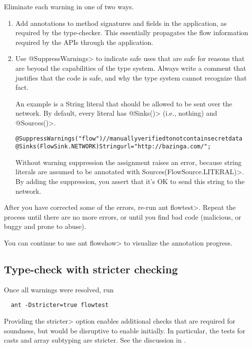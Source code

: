 Eliminate each warning in one of two ways.
\begin{enumerate}
\item Add annotations to method signatures and fields in the application, as
required by the type-checker. This essentially propagates the flow
information required by the APIs through the application.

\item Use \<@SuppressWarnings> to indicate safe uses that are safe for reasons
that are beyond the capabilities of the type system. Always write a
comment that justifies that the code is safe, and why the type system
cannot recognize that fact.

An example is a String literal that should be allowed to be sent
over the network. By default, every literal has \<@Sinks()>
(i.e., nothing) and \<@Sources()>.

\begin{alltt}
    @SuppressWarnings("flow") // manually verified to not contain secret data
    @Sinks(FlowSink.NETWORK) String url = "http://bazinga.com/";
\end{alltt}

Without warning suppression the assignment raises an error, because string literals
are assumed to be annotated with \<Sources(FlowSource.LITERAL)>. By adding the suppression, you
assert that it's OK to send this string to the network. 

\end{enumerate}

After you have corrected some of the errors, re-run \<ant flowtest>.
Repeat the process until there are no more errors, or until you find bad
code (malicious, or buggy and prone to abuse).

You can continue to use \<ant flowshow> to visualize the annotation
progress.  


\subsection{Type-check with stricter checking}

Once all warnings were resolved, run 

\begin{Verbatim}
  ant -Dstricter=true flowtest
\end{Verbatim}

\noindent
Providing the \<stricter> option enables additional checks that are
required for soundness, but would be disruptive to enable initially.
In particular, the tests for casts and array subtyping are stricter.
See the discussion in .

